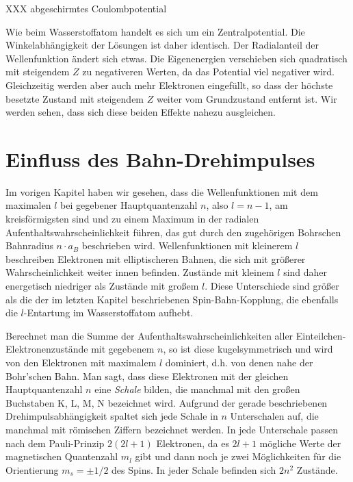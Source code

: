 \begin{marginfigure}
    \caption{XXX  abgeschirmtes Coulombpotential}
\end{marginfigure}

Wie beim Wasserstoffatom handelt es sich um ein Zentralpotential. Die Winkelabhängigkeit der Lösungen ist daher identisch. Der Radialanteil der Wellenfunktion ändert sich etwas. Die Eigenenergien verschieben sich quadratisch mit steigendem $Z$ zu negativeren Werten, da das Potential viel negativer wird. Gleichzeitig werden aber auch mehr Elektronen eingefüllt, so dass der höchste besetzte Zustand mit steigendem $Z$ weiter vom Grundzustand entfernt ist. Wir werden sehen, dass sich diese beiden Effekte nahezu ausgleichen.


\section{Einfluss des Bahn-Drehimpulses}

Im vorigen Kapitel haben wir gesehen, dass die Wellenfunktionen mit dem maximalen $l$ bei gegebener Hauptquantenzahl $n$, also $l=n-1$, am kreisförmigsten sind und zu einem Maximum in der radialen Aufenthaltswahrscheinlichkeit führen, das gut durch den zugehörigen Bohrschen Bahnradius $n \cdot a_B$ beschrieben wird. Wellenfunktionen mit kleinerem $l$ beschreiben Elektronen mit elliptischeren Bahnen, die sich mit größerer Wahrscheinlichkeit weiter innen befinden. Zustände mit kleinem $l$ sind daher energetisch niedriger als Zustände mit großem $l$. Diese Unterschiede sind größer als die der im letzten Kapitel beschriebenen Spin-Bahn-Kopplung, die ebenfalls die $l$-Entartung im Wasserstoffatom aufhebt.

Berechnet man die Summe der Aufenthaltswahrscheinlichkeiten aller Einteilchen-Elektronenzustände mit gegebenem $n$, so ist diese kugelsymmetrisch und wird von den Elektronen mit maximalem $l$ dominiert, d.h. von denen nahe  der Bohr'schen Bahn. 
Man sagt, dass diese Elektronen mit der gleichen Hauptquantenzahl $n$ eine \emph{Schale} bilden, die manchmal mit den großen Buchstaben K, L, M, N bezeichnet wird.  Aufgrund der gerade beschriebenen Drehimpulsabhängigkeit spaltet sich jede Schale in $n$ Unterschalen auf, die manchmal mit römischen Ziffern bezeichnet werden. In jede Unterschale passen nach dem Pauli-Prinzip $2 (2l +1)$ Elektronen, da es $2l +1$ mögliche Werte der magnetischen Quantenzahl $m_l$ gibt und dann noch je zwei Möglichkeiten für die Orientierung $m_s = \pm 1/2$ des Spins. In jeder Schale befinden sich $2n^2$ Zustände.

